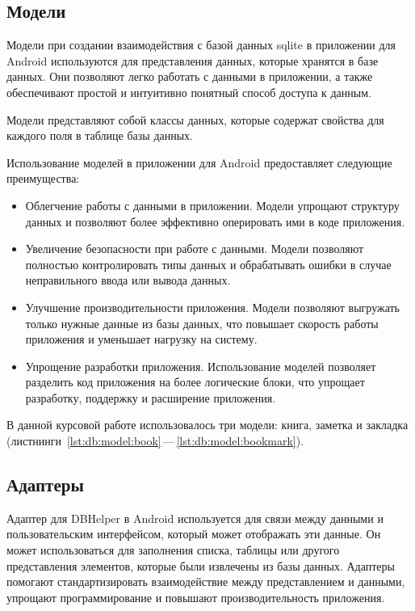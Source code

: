 \subsection{Модели}
Модели при создании взаимодействия с базой данных sqlite
в приложении для Android используются для представления данных,
которые хранятся в базе данных. Они позволяют легко
работать с данными в приложении, а также обеспечивают простой
и интуитивно понятный способ доступа к данным. \par
Модели представляют собой классы данных,
которые содержат свойства для каждого поля в таблице базы данных.\par
Использование моделей в приложении для Android предоставляет
следующие преимущества:

\begin{itemize}
	\item Облегчение работы с данными в приложении.
		Модели упрощают структуру данных и позволяют более
		эффективно оперировать ими в коде приложения.
	\item Увеличение безопасности при работе с данными.
		Модели позволяют полностью контролировать типы данных
		и обрабатывать ошибки в случае неправильного ввода или вывода данных.
	\item Улучшение производительности приложения.
		Модели позволяют выгружать только нужные данные из базы данных,
		что повышает скорость работы приложения
		и уменьшает нагрузку на систему.
	\item Упрощение разработки приложения.
		Использование моделей позволяет разделить код приложения
		на более логические блоки, что упрощает разработку,
		поддержку и расширение приложения.
\end{itemize}

В данной курсовой работе использовалось три модели: книга, заметка и закладка
(листнинги~\ref{lst:db:model:book}\,---\,\ref{lst:db:model:bookmark}).

\subsection{Адаптеры}
Адаптер для DBHelper в Android используется для связи между данными
и пользовательским интерфейсом, который может отображать эти данные.
Он может использоваться для заполнения списка, таблицы или
другого представления элементов, которые были извлечены из базы данных.
Адаптеры помогают стандартизировать взаимодействие между представлением
и данными, упрощают программирование
и повышают производительность приложения.


